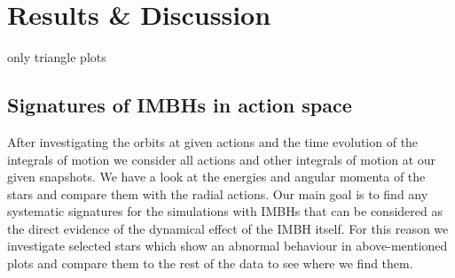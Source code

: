 \section{Results \& Discussion}
only triangle plots

\subsection{Signatures of \acp{IMBH} in action space}\label{results}
After investigating the orbits at given actions and the time evolution of the integrals of motion we consider all actions and other integrals of motion at our given snapshots. We have a look at the energies and angular momenta of the stars and compare them with the radial actions. Our main goal is to find any systematic signatures for the simulations with \acp{IMBH} that can be considered as the direct evidence of the dynamical effect of the \ac{IMBH} itself. For this reason we investigate selected stars which show an abnormal behaviour in above-mentioned plots and compare them to the rest of the data to see where we find them.

